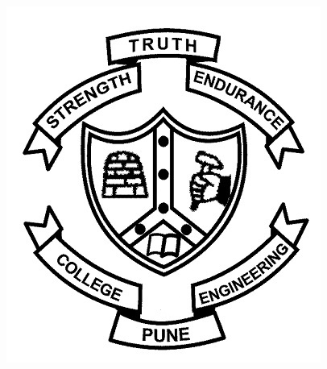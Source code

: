 \begin{titlepage}

\begin{center}

\vspace*{2\bigskipamount}

{\makeatletter
\titlestyle\bfseries\LARGE\@title
\makeatother}

{\makeatletter
\ifx\@subtitle\undefined\else
    \bigskip
    \titlefont\titleshape\Large\@subtitle
\fi
\makeatother}

\end{center}

\cleardoublepage
\thispagestyle{empty}

\begin{center}


\vspace*{2\bigskipamount}

{\makeatletter
\titlestyle\bfseries\LARGE\@title
\makeatother}

{\makeatletter
\ifx\@subtitle\undefined\else
    \bigskip
    \titlefont\titleshape\Large\@subtitle
\fi
\makeatother}

\vfill
\begin{center}
    \includegraphics[width=0.3\linewidth]{images/coep_logo.jpg}
\end{center}
\vfill


\end{center}
\end{titlepage}
